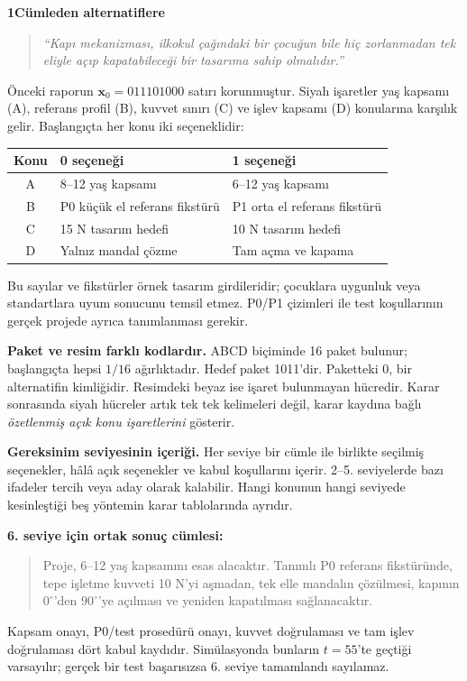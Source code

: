 \documentclass[11pt,a4paper]{article}
\newcommand{\heading}[2]{{\sffamily\small\color{blue!40!black}#1}\par{\sffamily\LARGE\bfseries#2}\par\vspace{3mm}}
\newcommand{\page}[2]{\newpage\heading{#1}{#2}}
\begin{document}
\page{Ortak gereksinim}{1\quad Cümleden alternatiflere}
\begin{quote}\itshape
``Kapı mekanizması, ilkokul çağındaki bir çocuğun bile hiç zorlanmadan tek
eliyle açıp kapatabileceği bir tasarıma sahip olmalıdır.''
\end{quote}
Önceki raporun $\mathbf x_0=011101000$ satırı korunmuştur. Siyah işaretler
yaş kapsamı (A), referans profil (B), kuvvet sınırı (C) ve işlev kapsamı (D)
konularına karşılık gelir. Başlangıçta her konu iki seçeneklidir:
\begin{center}\small\begin{tabular}{c p{56mm} p{66mm}}\toprule
Konu & 0 seçeneği & 1 seçeneği\\\midrule
A & 8--12 yaş kapsamı & 6--12 yaş kapsamı\\
B & P0 küçük el referans fikstürü & P1 orta el referans fikstürü\\
C & 15 N tasarım hedefi & 10 N tasarım hedefi\\
D & Yalnız mandal çözme & Tam açma ve kapama\\\bottomrule
\end{tabular}\end{center}
Bu sayılar ve fikstürler örnek tasarım girdileridir; çocuklara uygunluk veya
standartlara uyum sonucunu temsil etmez. P0/P1 çizimleri ile test koşullarının
gerçek projede ayrıca tanımlanması gerekir.

\textbf{Paket ve resim farklı kodlardır.} ABCD biçiminde 16 paket bulunur;
başlangıçta hepsi $1/16$ ağırlıktadır. Hedef paket 1011'dir. Paketteki 0,
bir alternatifin kimliğidir. Resimdeki beyaz ise işaret bulunmayan hücredir.
Karar sonrasında siyah hücreler artık tek tek kelimeleri değil, karar
kaydına bağlı \emph{özetlenmiş açık konu işaretlerini} gösterir.

\textbf{Gereksinim seviyesinin içeriği.} Her seviye bir cümle ile birlikte
seçilmiş seçenekler, hâlâ açık seçenekler ve kabul koşullarını içerir.
2--5. seviyelerde bazı ifadeler tercih veya aday olarak kalabilir. Hangi
konunun hangi seviyede kesinleştiği beş yöntemin karar tablolarında ayrıdır.

\textbf{6. seviye için ortak sonuç cümlesi:}
\begin{quote}
Proje, 6--12 yaş kapsamını esas alacaktır. Tanımlı P0 referans fikstüründe,
tepe işletme kuvveti 10 N'yi aşmadan, tek elle mandalın çözülmesi, kapının
$0^\circ$'den $90^\circ$'ye açılması ve yeniden kapatılması sağlanacaktır.
\end{quote}
Kapsam onayı, P0/test prosedürü onayı, kuvvet doğrulaması ve tam işlev
doğrulaması dört kabul kaydıdır. Simülasyonda bunların $t=55$'te geçtiği
varsayılır; gerçek bir test başarısızsa 6. seviye tamamlandı sayılamaz.
\end{document}
